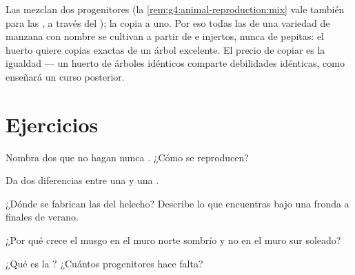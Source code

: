 \begin{remark}\label{rem:g4:plants-without-seeds:copy}
Las  mezclan dos progenitores (la
\cref{rem:g4:animal-reproduction:mix} vale también para las , a
través del ); la  copia a uno. Por eso
todas las  de una variedad de manzana con nombre se cultivan a
partir de  e injertos, nunca de pepitas: el huerto quiere
copias exactas de un árbol excelente. El precio de copiar es la
igualdad --- un huerto de árboles idénticos comparte debilidades
idénticas, como enseñará un curso posterior.
\end{remark}

\section{Ejercicios}

\begin{exercise}[$\star$]\label{exo:g4:plants-without-seeds:1}
Nombra dos  que no hagan nunca . ¿Cómo se reproducen?
\end{exercise}

\begin{exercise}[$\star$]\label{exo:g4:plants-without-seeds:2}
Da dos diferencias entre una  y una .
\end{exercise}

\begin{exercise}[$\star$]\label{exo:g4:plants-without-seeds:3}
¿Dónde se fabrican las  del helecho? Describe lo que encuentras
bajo una fronda a finales de verano.
\end{exercise}

\begin{exercise}[$\star$]\label{exo:g4:plants-without-seeds:4}
¿Por qué crece el musgo en el muro norte sombrío y no en el muro sur
soleado?
\end{exercise}

\begin{exercise}[$\star$]\label{exo:g4:plants-without-seeds:5}
¿Qué es la ? ¿Cuántos progenitores hace falta?
\end{exercise}

